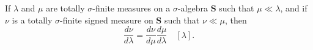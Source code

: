 If $\lambda$ and $\mu$ are totally $\sigma$-finite measures on a $\sigma$-algebra $\mathbf{S}$ such that $\mu \ll \lambda$, and if $\nu$ is a totally $\sigma$-finite signed measure on $\mathbf{S}$ such that $\nu \ll \mu$, then
$$\frac{d\nu}{d\lambda} = \frac{d\nu}{d\mu} \frac{d\mu}{d\lambda} \quad [\lambda].$$
